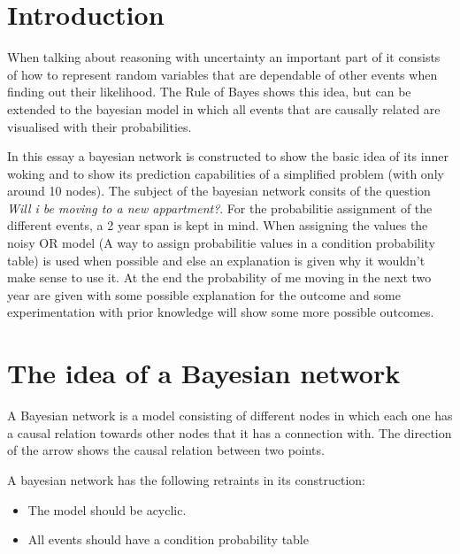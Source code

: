 \documentclass[12pt]{article} %
\begin{document}
\section{Introduction} %

When talking about reasoning with uncertainty an important part of it consists
of how to represent random variables that are dependable of other events when finding out
their likelihood. The Rule of Bayes shows this idea, but can be extended to the
bayesian model in which all events that are causally related are visualised with
their probabilities.

In this essay a bayesian network is constructed to show the basic idea of its
inner woking and to
show its prediction capabilities of a simplified problem (with only around 10
nodes). The subject of the
bayesian network consits of the question \emph{Will i be moving to a new
appartment?}. For the probabilitie assignment of the different events, a 2 year span is
kept in mind. When assigning the values the noisy OR model (A way to assign
probabilitie values in a condition probability table) is used when possible
and else an explanation is given why it wouldn't make sense to use it. 
At the end the probability of me moving in the next two year are given with some
possible explanation for the outcome and some
experimentation with prior knowledge will show some more possible outcomes.


\section{The idea of a Bayesian network} %

A Bayesian network is a model consisting of different nodes in which each one
has a causal relation towards other nodes that it has a connection with. The
direction of the arrow shows the causal relation between two points.

A bayesian network has the following retraints in its construction:
\begin{itemize}
    \item The model should be acyclic. 
    \item All events should have a condition probability table 
\end{itemize}



\end{document}
